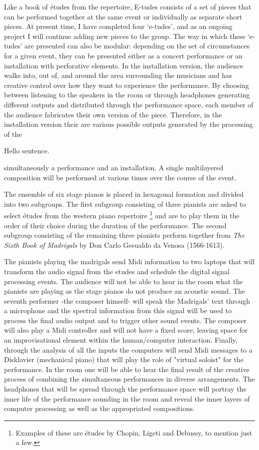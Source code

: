 Like a book of \'{e}tudes from the repertoire, E-tudes consists of a set of pieces that can be performed together at the same event or individually as separate short pieces. At present time, I have completed four `e-tudes', and as an ongoing project I will continue adding new pieces to the group. The way in which these `e-tudes' are presented can also be modular: depending on the set of circumstances for a given event, they can be presented either as a concert performance or an installation with perforative elements. In the installation version, the audience walks into, out of, and around the area surrounding the musicians and has creative control over how they want to experience the performance. By choosing between listening to the speakers in the room or through headphones generating different outputs and distributed through the performance space, each member of the audience fabricates their own version of the piece. Therefore, in the installation version their are various possible outputs generated by the processing of the

Hello sentence.

	simultaneously a performance and an installation. A single multilayered composition will be performed at various times over the course of the event.

The ensemble of six stage pianos is placed in hexagonal formation and divided into two subgroups. The first subgroup consisting of three pianists are asked to select \'{e}tudes from the western piano repertoire \footnote{Examples of these are \'{e}tudes by Chopin, Ligeti and Debussy, to mention just a few.} and are to play them in the order of their choice during the duration of the performance. The second subgroup consisting of the remaining three pianists perform together from \emph{The Sixth Book of Madrigals} by Don Carlo Gesualdo da Venosa (1566-1613). 

The pianists playing the madrigals send Midi information to two laptops that will transform the audio signal from the etudes and schedule the digital signal processing events. The audience will not be able to hear in the room what the pianists are playing as the stage pianos do not produce an acoustic sound. The seventh performer -the composer himself- will speak the Madrigals' text through a microphone and the spectral information from this signal will be used to process the final audio output and to trigger other sound events. The composer will also play a Midi controller and will not have a fixed score, leaving space for an improvisational element within the human/computer interaction. Finally, through the analysis of all the inputs the computers will send Midi messages to a Disklavier (mechanical piano) that will play the role of "virtual soloist" for the performance. In the room one will be able to hear the final result of the creative process of combining the simultaneous performances in diverse arrangements. The headphones that will be spread through the performance space will portray the inner life of the performance sounding in the room and reveal the inner layers of computer processing as well as the appropriated compositions.

